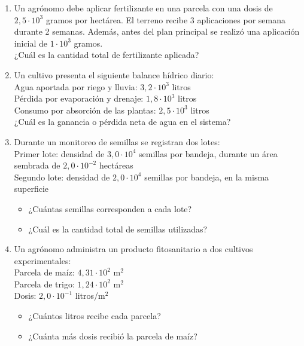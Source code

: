 \documentclass[12pt]{article}
\begin{document}
	\begin{enumerate}
		\item Un agrónomo debe aplicar fertilizante en una parcela con una dosis de $2{,}5 \cdot 10^3$ gramos por hectárea. El terreno recibe 3 aplicaciones por semana durante 2 semanas. Además, antes del plan principal se realizó una aplicación inicial de $1 \cdot 10^3$ gramos. \\
		¿Cuál es la cantidad total de fertilizante aplicada?
		
		\item Un cultivo presenta el siguiente balance hídrico diario: \\
		Agua aportada por riego y lluvia: $3{,}2 \cdot 10^3$ litros \\
		Pérdida por evaporación y drenaje: $1{,}8 \cdot 10^3$ litros \\
		Consumo por absorción de las plantas: $2{,}5 \cdot 10^3$ litros \\
		¿Cuál es la ganancia o pérdida neta de agua en el sistema?
		
		\item Durante un monitoreo de semillas se registran dos lotes: \\
		Primer lote: densidad de $3{,}0 \cdot 10^4$ semillas por bandeja, durante un área sembrada de $2{,}0 \cdot 10^{-2}$ hectáreas \\
		Segundo lote: densidad de $2{,}0 \cdot 10^4$ semillas por bandeja, en la misma superficie \\
		\begin{itemize}
			\item[a)] ¿Cuántas semillas corresponden a cada lote?
			\item[b)] ¿Cuál es la cantidad total de semillas utilizadas?
		\end{itemize}
		
		\item Un agrónomo administra un producto fitosanitario a dos cultivos experimentales: \\
		Parcela de maíz: $4{,}31 \cdot 10^2$ m$^2$ \\
		Parcela de trigo: $1{,}24 \cdot 10^2$ m$^2$ \\
		Dosis: $2{,}0 \cdot 10^{-1}$ litros/m$^2$ \\
		\begin{itemize}
			\item[a)] ¿Cuántos litros recibe cada parcela?
			\item[b)] ¿Cuánta más dosis recibió la parcela de maíz?
		\end{itemize}
	\end{enumerate}
	
\end{document}
